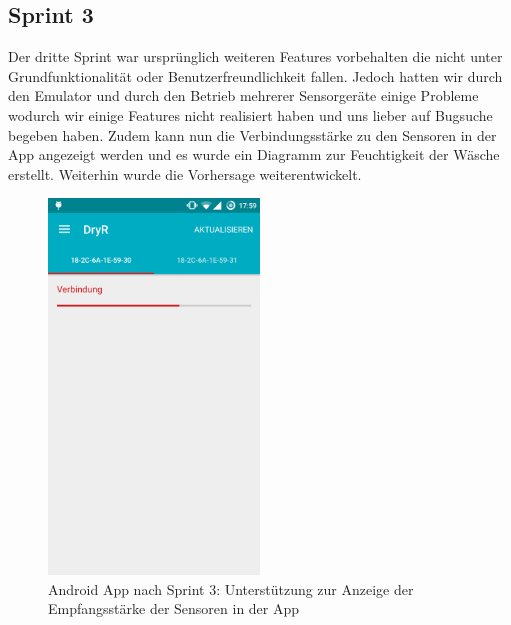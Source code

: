 \subsection{Sprint 3}
Der dritte Sprint war ursprünglich weiteren Features vorbehalten die nicht unter Grundfunktionalität oder Benutzerfreundlichkeit fallen.
Jedoch hatten wir durch den Emulator und durch den Betrieb mehrerer Sensorgeräte einige Probleme wodurch wir einige Features nicht realisiert haben und uns lieber auf Bugsuche begeben haben. Zudem kann nun die Verbindungsstärke zu den Sensoren in der App angezeigt werden und es wurde ein Diagramm zur Feuchtigkeit der Wäsche erstellt. Weiterhin wurde die Vorhersage weiterentwickelt.
\begin{figure}[htb] 
	\centerline{\includegraphics[width=0.5\textwidth]{sensor_status_reception.png}}
	\caption{Android App nach Sprint 3: Unterstützung zur Anzeige der Empfangsstärke der Sensoren in der App}
	\label{screenshot_sprint_3_sensor_status}
\end{figure}
